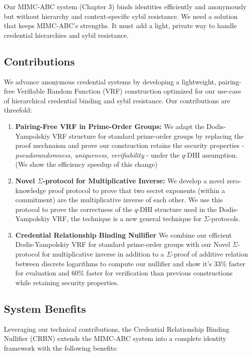 Our MIMC-ABC system (Chapter 3) binds identities efficiently and anonymously but without hierarchy and context-specific sybil resistance. We need a solution that keeps MIMC-ABC’s strengths. It must add a light, private way to handle credential hierarchies and sybil resistance.




\subsection{Contributions}

We advance anonymous credential systems by developing a lightweight, pairing-free Verifiable Random Function (VRF) construction optimized for our use-case of hierarchical credential binding and sybil resistance. Our contributions are threefold:

\begin{enumerate}
        \item \textbf{Pairing-Free VRF in Prime-Order Groups:} We adapt the Dodis-Yampolskiy VRF structure for standard prime-order groups by replacing the proof mechnaism and prove our construction retains the security properties - \emph{pseudorandomness, uniqueness, verifiability} - under the $q$-DHI assumption. (We show the efficiency speedup of this change)

        \item \textbf{Novel $\Sigma$-protocol for Multiplicative Inverse:} We develop a novel zero-knowledge proof protocol to prove that two secret exponents (within a commitment) are the multiplicative inverse of each other. We use this protocol to prove the correctness of the $q$-DHI structure used in the Dodis-Yampolskiy VRF, the technique is a new general technique for $\Sigma$-protocols.
        
        \item \textbf{Credential Relationship Binding Nullifier } We combine our efficient Dodis-Yampolskiy VRF for standard prime-order groups with our Novel $\Sigma$-protocol for multiplicative inverse in addition to a $\Sigma$-proof of additive relation between discrete logarithms to compute our nullifier and show it's 33\% faster for evaluation and 60\% faster for verification than previous constructions while retaining security properties.

\end{enumerate}


\subsection{System Benefits}
Leveraging our technical contributions, the Credential Relationship Binding Nullifier (CRBN) extends the MIMC-ABC system into a complete identity framework with the following benefits:

